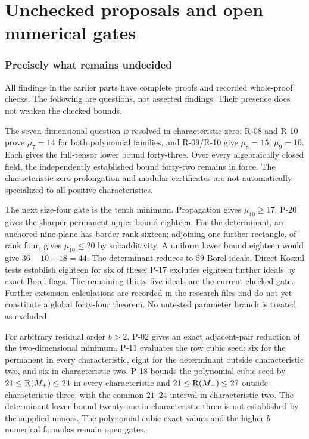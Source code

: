\part{Unchecked proposals and open numerical gates}
\section{Precisely what remains undecided}

All findings in the earlier parts have complete proofs and recorded
whole-proof checks. The following are questions, not asserted findings.
Their presence does not weaken the checked bounds.

The seven-dimensional question is resolved in characteristic zero:
R-08 and R-10 prove $\mu_7=14$ for both polynomial families, and
R-09/R-10 give $\mu_8=15$, $\mu_9=16$. Each gives the full-tensor
lower bound forty-three. Over every algebraically closed field,
the independently established bound forty-two remains in force.
The characteristic-zero prolongation and modular certificates
are not automatically specialized to all positive characteristics.

The next size-four gate is the tenth minimum. Propagation gives
$\mu_{10}\geq17$. P-20 gives the sharper permanent upper bound
eighteen. For the determinant, an anchored nine-plane has border
rank sixteen; adjoining one further rectangle, of rank four, gives
$\mu_{10}\leq20$ by subadditivity. A uniform lower bound eighteen
would give $36-10+18=44$. The determinant reduces to $59$ Borel
ideals. Direct Koszul tests establish eighteen for six of these;
P-17 excludes eighteen further ideals by exact Borel flags.
The remaining thirty-five ideals are the current checked gate.
Further extension calculations are recorded in the research files
and do not yet constitute a global forty-four theorem. No untested parameter
branch is treated as excluded.

For arbitrary residual order $b>2$, P-02 gives an exact adjacent-pair
reduction of the two-dimensional minimum. P-11 evaluates the row
cubic seed: six for the permanent in every characteristic, eight
for the determinant outside characteristic two, and six in
characteristic two. P-18 bounds the polynomial cubic seed by
$21\leq\underline{\mathrm R}(M_+)\leq24$ in every characteristic and
$21\leq\underline{\mathrm R}(M_-)\leq27$ outside characteristic three, with the
common $21$--$24$ interval in characteristic two. The determinant
lower bound twenty-one in characteristic three is not established
by the supplied minors. The polynomial cubic exact values and
the higher-$b$ numerical formulas remain open gates.

